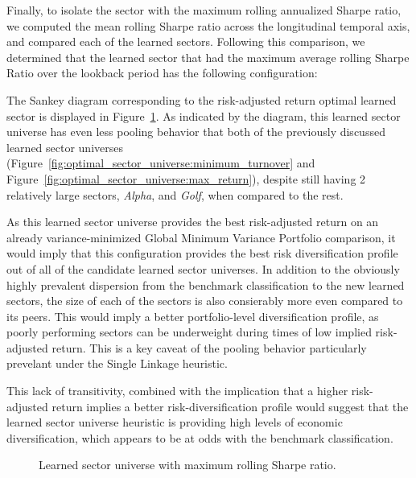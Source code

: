\documentclass[../main.tex]{subfiles}
\begin{document}
Finally, to isolate the sector with the maximum rolling annualized Sharpe ratio, we computed the mean rolling Sharpe ratio across the longitudinal temporal axis, and compared each of the learned sectors. Following this comparison, we determined that the learned sector that had the maximum average rolling Sharpe Ratio over the lookback period has the following configuration:

\begin{minipage}{\linewidth}
    \centering
    \bfseries
\end{minipage}

\vspace{1em}

The Sankey diagram corresponding to the risk-adjusted return optimal learned sector is displayed in Figure~\ref{fig:optimal_sector_universe:max_sharpe}. As indicated by the diagram, this learned sector universe has even less pooling behavior that both of the previously discussed learned sector universes (Figure~\ref{fig:optimal_sector_universe:minimum_turnover} and Figure~\ref{fig:optimal_sector_universe:max_return}), despite still having 2 relatively large sectors, \textit{Alpha}, and \textit{Golf}, when compared to the rest.

As this learned sector universe provides the best risk-adjusted return on an already variance-minimized Global Minimum Variance Portfolio comparison, it would imply that this configuration provides the best risk diversification profile out of all of the candidate learned sector universes. In addition to the obviously highly prevalent dispersion from the benchmark classification to the new learned sectors, the size of each of the sectors is also consierably more even compared to its peers. This would imply a better portfolio-level diversification profile, as poorly performing sectors can be underweight during times of low implied risk-adjusted return. This is a key caveat of the pooling behavior particularly prevelant under the Single Linkage heuristic.

This lack of transitivity, combined with the implication that a higher risk-adjusted return implies a better risk-diversification profile would suggest that the learned sector universe heuristic is providing high levels of economic diversification, which appears to be at odds with the benchmark classification.

\begin{figure}
    \centering
    \caption{Learned sector universe with maximum rolling Sharpe ratio.}
    \label{fig:optimal_sector_universe:max_sharpe}
\end{figure}
\end{document}
